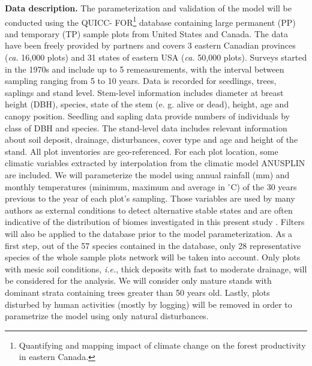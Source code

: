 \textbf{Data description.} The parameterization and validation of the model
will be conducted using the QUICC- FOR\footnote{Quantifying and mapping impact
of climate change on the forest productivity in eastern Canada.} database
containing large permanent (PP) and temporary (TP) sample plots from United
States and Canada. The data have been freely provided by partners and covers 3
eastern Canadian provinces (\textit{ca.} 16,000 plots) and 31 states of
eastern USA (\textit{ca.} 50,000 plots). Surveys started in the 1970s and
include up to 5 remeasurements, with the interval between sampling ranging
from 5 to 10 years. Data is recorded for seedlings, trees, saplings and stand
level. Stem-level information includes diameter at breast height (DBH),
species, state of the stem (e. g. alive or dead), height, age and canopy
position. Seedling and sapling data provide numbers of individuals by class of
DBH and species. The stand-level data includes relevant information about
soil deposit, drainage, disturbances, cover type and age and height of the
stand. All plot inventories are geo-referenced. For each plot location, some
climatic variables extracted by interpolation from the climatic
model ANUSPLIN \cite{McKenney2011} are included. We will parameterize the model using
annual rainfall (mm) and monthly temperatures (minimum, maximum and average in
\ensuremath{^\circ}C) of the 30 years previous to the year of each plot's sampling.
Those variables are used by many authors as external conditions to detect
alternative stable states and are often indicative of the distribution of
biomes investigated in this present study
\cite{Goldblum2010,Hirota2011,Scheffer2012}. Filters will also be applied to the
database prior to the model parameterization. As a first step, out of the 57
species contained in the database, only 28 representative species of the
whole sample plots network will be taken into account. Only plots with mesic
soil conditions, \textit{i.e.}, thick deposits with fast to moderate drainage,
will be considered for the analysis. We will consider only mature stands
with dominant strata containing trees greater than 50 years old. Lastly, plots
disturbed by human activities (mostly by logging) will be removed in order to
parametrize the model using only natural disturbances. \\

